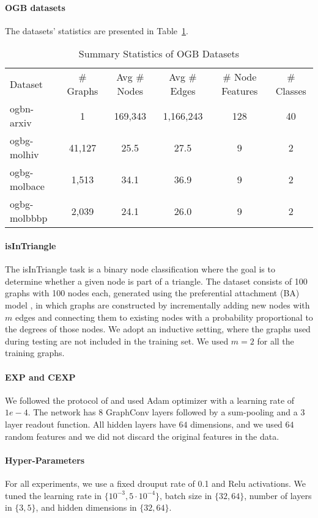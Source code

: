  \paragraph{OGB datasets}
The datasets' statistics are presented in Table~\ref{tab:ogb_summary}.
\begin{table}[ht]
    \centering
    \caption{Summary Statistics of OGB Datasets}
    \label{tab:ogb_summary}
    \vskip 0.15in
    \begin{tabular}{lccccc} 

\toprule
Dataset  & \# Graphs & Avg \# Nodes & Avg \# Edges & \# Node Features &\# Classes  \\ 


ogbn-arxiv &1& 169,343     & 1,166,243          & 128          & 40  \\
ogbg-molhiv & 41,127	& 25.5 & 27.5 & 9&2\\

ogbg-molbace &1,513 &34.1 &36.9 & 9&2 \\
ogbg-molbbbp & 2,039& 24.1& 26.0& 9& 2\\ 





\bottomrule
    \end{tabular}
\end{table}




 \paragraph{isInTriangle}
The isInTriangle task is a binary node classification where the goal is to determine whether a given node is part of a triangle.
The dataset consists of 100 graphs with 100 nodes each, generated using the preferential attachment (BA) model \citep{badist}, in which graphs are constructed by incrementally adding new nodes with $m$ edges and connecting them to existing nodes with a probability proportional to the degrees of those nodes. We adopt an inductive setting, where the graphs used during testing are not included in the training set. 
We used $m=2$ for all the training graphs.


  \paragraph{EXP and CEXP}
  We followed the protocol of \citet{abboud2021surprisingpowergraphneural} and used Adam optimizer with a learning rate of $1e-4$. The network has $8$ GraphConv layers followed by a sum-pooling and a $3$ layer readout function. All hidden layers have $64$ dimensions, and we used $64$ random features and we did not discard the original features in the data. 



\paragraph{Hyper-Parameters}
For all experiments, we use a fixed drouput rate of 0.1 and Relu activations.
We tuned the learning rate in $\{10^{-3}, 5\cdot 10^{-4}\}$, batch size in $\{32, 64\}$, number of layers in $\{3, 5\}$, and hidden dimensions in $\{32, 64\}$. 


